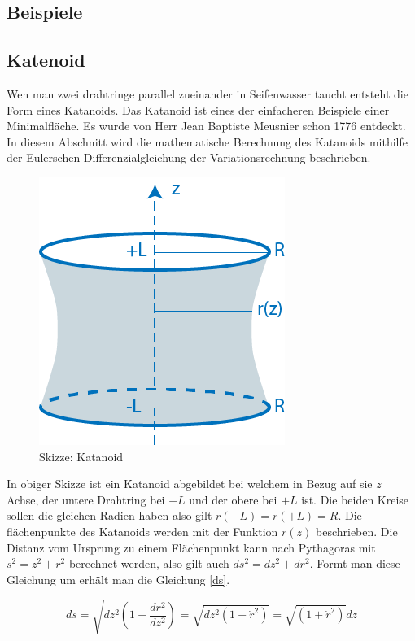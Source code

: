\begin{refsection}
\section{Beispiele}
\subsection{Katenoid}
Wen man zwei drahtringe parallel zueinander in Seifenwasser taucht entsteht die Form eines Katanoids. 
Das Katanoid ist eines der einfacheren Beispiele einer Minimalfläche. 
Es wurde von Herr Jean Baptiste Meusnier schon 1776 entdeckt.
In diesem Abschnitt wird die mathematische Berechnung des Katanoids mithilfe der Eulerschen Differenzialgleichung der Variationsrechnung beschrieben.
\begin{figure}[H]
  \centering
  \includegraphics[scale=1]{minimal/soap_film_catanoid.PNG}
  \caption{Skizze: Katanoid} 
\end{figure}
In obiger Skizze ist ein Katanoid abgebildet bei welchem in Bezug auf sie $z$ Achse, der untere Drahtring bei $-L$ und der obere bei $+L$ ist. 
Die beiden Kreise sollen die gleichen Radien haben also gilt $r(-L)=r(+L)=R$. Die flächenpunkte des Katanoids werden mit der Funktion $r(z)$ beschrieben. 
Die Distanz vom Ursprung zu einem Flächenpunkt kann nach Pythagoras mit $s^2=z^2+r^2$ berechnet werden, also gilt auch $ds^2=dz^2+dr^2$.
Formt man diese Gleichung um erhält man die Gleichung \eqref{ds}.

\begin{equation} \label{ds}
  ds=\sqrt{dz^2(1+\frac{dr^2}{dz^2})}= \sqrt{dz^2(1+\dot r^2)}=\sqrt{(1+\dot r^2)}dz
\end{equation}

\end{refsection}
